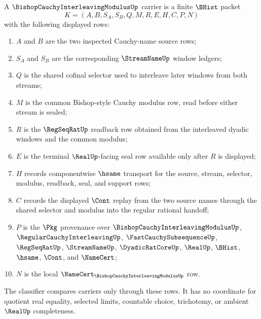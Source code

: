 \begin{definition}
\label{def:bishop-cauchy-interleaving-modulus-carrier}
A $\BishopCauchyInterleavingModulusUp$ carrier is a finite $\BHist$ packet
$$
K=(A,B,S_A,S_B,Q,M,R,E,H,C,P,N)
$$
with the following displayed rows:
\begin{enumerate}
\item $A$ and $B$ are the two inspected Cauchy-name source rows;
\item $S_A$ and $S_B$ are the corresponding $\StreamNameUp$ window ledgers;
\item $Q$ is the shared cofinal selector used to interleave later windows from both streams;
\item $M$ is the common Bishop-style Cauchy modulus row, read before either stream is sealed;
\item $R$ is the $\RegSeqRatUp$ readback row obtained from the interleaved dyadic windows and the common modulus;
\item $E$ is the terminal $\RealUp$-facing seal row available only after $R$ is displayed;
\item $H$ records componentwise $\hsame$ transport for the source, stream, selector, modulus, readback, seal, and support rows;
\item $C$ records the displayed $\Cont$ replay from the two source names through the shared selector and modulus into the regular rational handoff;
\item $P$ is the $\Pkg$ provenance over $\BishopCauchyInterleavingModulusUp$, $\RegularCauchyInterleavingUp$, $\FastCauchySubsequenceUp$, $\RegSeqRatUp$, $\StreamNameUp$, $\DyadicRatCoreUp$, $\RealUp$, $\BHist$, $\hsame$, $\Cont$, and $\NameCert$;
\item $N$ is the local $\NameCert_{\BishopCauchyInterleavingModulusUp}$ row.
\end{enumerate}
The classifier compares carriers only through these rows. It has no coordinate for quotient real equality, selected limits, countable choice, trichotomy, or ambient $\RealUp$ completeness.
\end{definition}

